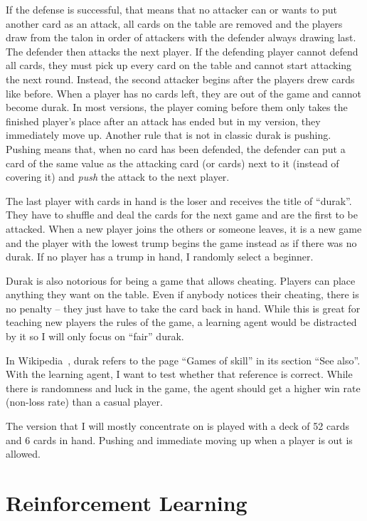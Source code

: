\documentclass[a4paper,titlepage]{article}
\begin{document}
If the defense is successful, that means that no attacker can or wants to put another card as an attack, all cards on the table are removed and the players draw from the talon in order of attackers with the defender always drawing last. The defender then attacks the next player.
If the defending player cannot defend all cards, they must pick up every card on the table and cannot start attacking the next round. Instead, the second attacker begins after the players drew cards like before.
When a player has no cards left, they are out of the game and cannot become durak. In most versions, the player coming before them only takes the finished player's place after an attack has ended but in my version, they immediately move up.
Another rule that is not in classic durak is pushing. Pushing means that, when no card has been defended, the defender can put a card of the same value as the attacking card (or cards) next to it (instead of covering it) and \emph{push} the attack to the next player.

The last player with cards in hand is the loser and receives the title of ``durak''. They have to shuffle and deal the cards for the next game and are the first to be attacked. When a new player joins the others or someone leaves, it is a new game and the player with the lowest trump begins the game instead as if there was no durak. If no player has a trump in hand, I randomly select a beginner. \medskip

Durak is also notorious for being a game that allows cheating. Players can place anything they want on the table. Even if anybody notices their cheating, there is no penalty -- they just have to take the card back in hand. While this is great for teaching new players the rules of the game, a learning agent would be distracted by it so I will only focus on ``fair'' durak.

In Wikipedia~\cite{wikidurak}, durak refers to the page ``Games of skill'' in its section ``See also''. With the learning agent, I want to test whether that reference is correct. While there is randomness and luck in the game, the agent should get a higher win rate (non-loss rate) than a casual player. \medskip

The version that I will mostly concentrate on is played with a deck of 52 cards and 6 cards in hand. Pushing and immediate moving up when a player is out is allowed.

\section{Reinforcement Learning}
\end{document}

